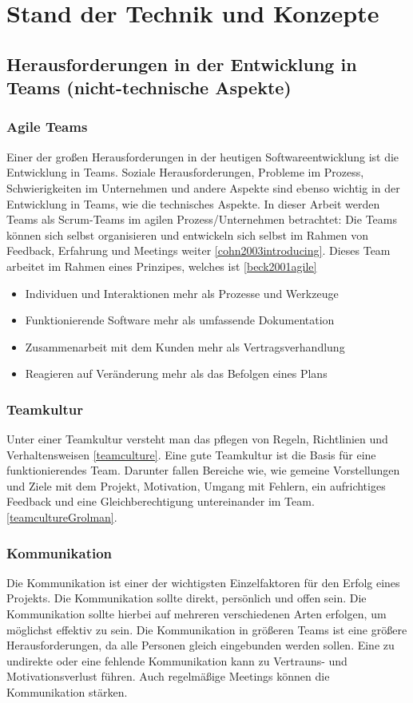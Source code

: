 \chapter{Stand der Technik und Konzepte}
\chapterstart

\label{chap:related}
\section{Herausforderungen in der Entwicklung in Teams (nicht-technische Aspekte)}
\subsection{Agile Teams}
Einer der großen Herausforderungen in der heutigen Softwareentwicklung ist die Entwicklung in Teams. Soziale Herausforderungen, Probleme im Prozess, Schwierigkeiten im Unternehmen und andere Aspekte sind ebenso wichtig in der Entwicklung in Teams, wie die technisches Aspekte. In dieser Arbeit werden Teams als Scrum-Teams im agilen Prozess/Unternehmen betrachtet: Die Teams können sich selbst organisieren und entwickeln sich selbst im Rahmen von Feedback, Erfahrung und Meetings weiter \ref{cohn2003introducing}. Dieses Team arbeitet im Rahmen eines Prinzipes, welches ist \ref{beck2001agile}
\begin{itemize} 
\item Individuen und Interaktionen mehr als Prozesse und Werkzeuge
\item Funktionierende Software mehr als umfassende Dokumentation
\item Zusammenarbeit mit dem Kunden mehr als Vertragsverhandlung
\item Reagieren auf Veränderung mehr als das Befolgen eines Plans
\end{itemize}
\subsection{Teamkultur}
Unter einer Teamkultur versteht man das pflegen von Regeln, Richtlinien und Verhaltensweisen \ref{teamculture}. Eine gute Teamkultur ist die Basis für eine funktionierendes Team. Darunter fallen Bereiche wie, wie gemeine Vorstellungen und Ziele mit dem Projekt, Motivation, Umgang mit Fehlern, ein aufrichtiges Feedback und eine Gleichberechtigung untereinander im Team. \ref{teamcultureGrolman}. 
\subsection{Kommunikation}
Die Kommunikation ist einer der wichtigsten Einzelfaktoren für den Erfolg eines Projekts. Die Kommunikation sollte direkt, persönlich und offen sein. Die Kommunikation sollte hierbei auf mehreren verschiedenen Arten erfolgen, um möglichst effektiv zu sein. Die Kommunikation in größeren Teams ist eine größere Herausforderungen, da alle Personen gleich eingebunden werden sollen. Eine zu undirekte oder eine fehlende Kommunikation kann zu Vertrauns- und Motivationsverlust führen. Auch regelmäßige Meetings können die Kommunikation stärken.
